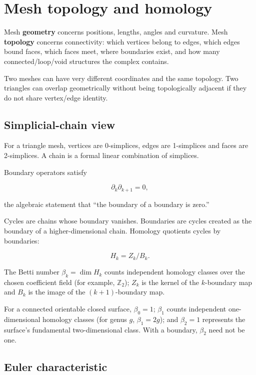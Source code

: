 \hypertarget{appendix-e38976cbbf86}{}\label{referencestart:appendix-e38976cbbf86}
\section{Mesh topology and homology}\label{appendix-e38976cbbf86-mesh-topology-and-homology}

Mesh \textbf{geometry} concerns positions, lengths, angles and curvature. Mesh \textbf{topology} concerns connectivity: which vertices belong to edges, which edges bound faces, which faces meet, where boundaries exist, and how many connected/loop/void structures the complex contains.

Two meshes can have very different coordinates and the same topology. Two triangles can overlap geometrically without being topologically adjacent if they do not share vertex/edge identity.

\subsection{Simplicial-chain view}\label{appendix-e38976cbbf86-simplicial-chain-view}

For a triangle mesh, vertices are 0-simplices, edges are 1-simplices and faces are 2-simplices. A chain is a formal linear combination of simplices.

Boundary operators satisfy

\[
\partial_k\partial_{k+1}=0,
\]

the algebraic statement that ``the boundary of a boundary is zero.''

Cycles are chains whose boundary vanishes. Boundaries are cycles created as the boundary of a higher-dimensional chain. Homology quotients cycles by boundaries:

\[
H_k=Z_k/B_k.
\]

The Betti number \(\beta_k=\dim H_k\) counts independent homology classes over the chosen coefficient field (for example, \(\mathbb{Z}_2\)); \(Z_k\) is the kernel of the \(k\)-boundary map and \(B_k\) is the image of the \((k+1)\)-boundary map.

For a connected orientable closed surface, \(\beta_0=1\); \(\beta_1\) counts independent one-dimensional homology classes (for genus \(g\), \(\beta_1=2g\)); and \(\beta_2=1\) represents the surface's fundamental two-dimensional class. With a boundary, \(\beta_2\) need not be one.

\subsection{Euler characteristic}\label{appendix-e38976cbbf86-euler-characteristic}

